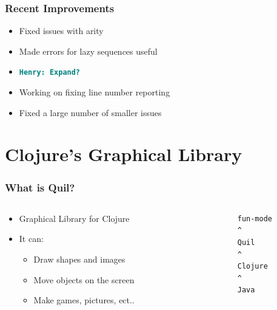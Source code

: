 \documentclass{beamer}
\newcommand{\comment}[1]{{\bf \tt  {#1}}}
\newcommand{\hfcomment}[1]{\textcolor{Teal}{\comment{Henry: {#1}}}}
\begin{document}
\begin{frame}
	\frametitle{Recent Improvements}
	\begin{itemize}
		\item Fixed issues with arity 
		\item Made errors for lazy sequences useful
		\item \hfcomment{Expand?}
		\item Working on fixing line number reporting
		\item Fixed a large number of smaller issues
	\end{itemize}
\end{frame}

\section{Clojure's Graphical Library}

\begin{frame}[fragile]
	\frametitle{What is Quil?}

  		\begin{columns}[t]
		\begin{column}{.55\textwidth}
		\begin{itemize}
  		\item Graphical Library for Clojure
  		\item It can:
  		\begin{itemize}
  	 		\item Draw shapes and images
  	 		\item Move objects on the screen
  	 		\item Make games, pictures, ect..
  		\end{itemize}
  		\end{itemize}
		\end{column}
		\begin{column}{.45\textwidth}
			\begin{verbatim}
			fun-mode
			^
			Quil
			^
			Clojure
			^
			Java
			\end{verbatim}
		\end{column}
		\end{columns}
\end{frame}
\end{document}
